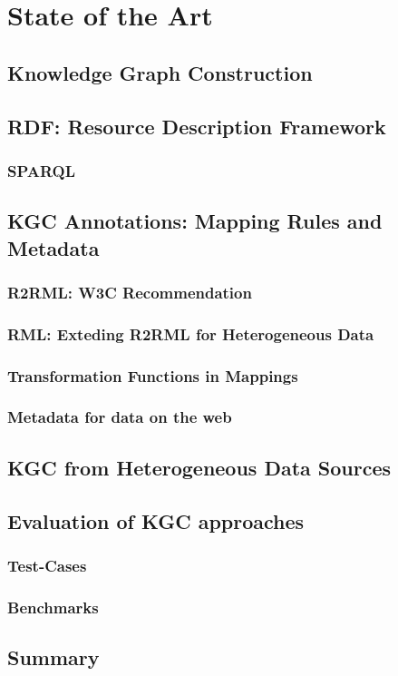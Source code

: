 \chapter{State of the Art}
\label{chap:soa}


\section{Knowledge Graph Construction}

\section{RDF: Resource Description Framework}

\subsection{SPARQL}


\section{KGC Annotations: Mapping Rules and Metadata}

\subsection{R2RML: W3C Recommendation}

\subsection{RML: Exteding R2RML for Heterogeneous Data}

\subsection{Transformation Functions in Mappings}

\subsection{Metadata for data on the web}


\section{KGC from Heterogeneous Data Sources}

\section{Evaluation of KGC approaches}

\subsection{Test-Cases}
\subsection{Benchmarks}



\section{Summary}
